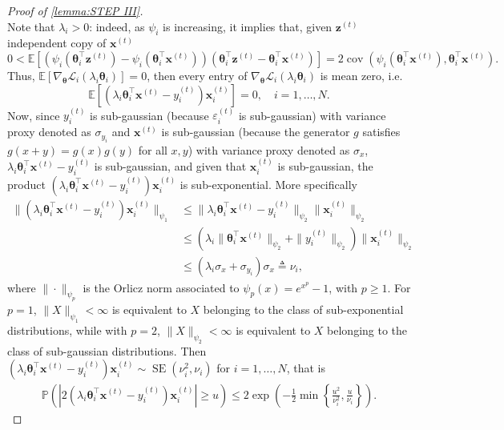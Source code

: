 \documentclass{article} %
\begin{document}
\begin{proof}[Proof of \cref{lemma:STEP III}]
\begin{equation}
\end{equation}
Note that $\lambda_i>0$: indeed, as $\psi_i$ is increasing, it implies that, given $\mathbf{z}^{(t)}$ independent copy of $\mathbf{x}^{(t)}$
\begin{equation}\label{eq:lambda_positive}
0<\mathbb{E}\left[\left(\psi_i\left(\boldsymbol{\theta}_i^\top \mathbf{z}^{(t)}\right)-\psi_i\left(\boldsymbol{\theta}_i^\top \mathbf{x}^{(t)}\right)\right)\left(\boldsymbol{\theta}_i^\top \mathbf{z}^{(t)}-\boldsymbol{\theta}_i^\top \mathbf{x}^{(t)}\right)\right]=2 \operatorname{cov}\left(\psi_i\left(\boldsymbol{\theta}_i^\top \mathbf{x}^{(t)}\right), \boldsymbol{\theta}_i^\top \mathbf{x}^{(t)}\right).
\end{equation}
\noindent
Thus, $\mathbb{E}\left[\nabla_{\boldsymbol{\theta}} \mathscr{L}_i\left(\lambda_i\boldsymbol{\theta}_i\right)\right]= 0$, then every entry of $\nabla_{\boldsymbol{\theta}} \mathscr{L}_i\left(\lambda_i\boldsymbol{\theta}_i\right)$ is mean zero, i.e.
$$
\mathbb{E}\left[(\lambda_i\boldsymbol{\theta}_i^{\top} \mathbf{x}^{(t)}- y_i^{(t)}) \mathbf{x}_{i}^{(t)}\right]=0, \quad i=1,\dots,N.
$$
\noindent
Now, since $y_i^{(t)}$ is sub-gaussian (because $\varepsilon^{(t)}_i$ is sub-gaussian) with variance proxy denoted as $\sigma_{y_i}$ and $\mathbf{x}^{(t)}$ is sub-gaussian (because the generator $g$ satisfies $g(x+y)=g(x)g(y)$ for all $x,y$) with variance proxy denoted as $\sigma_x$, $\lambda_i\boldsymbol{\theta}_i^{\top} \mathbf{x}^{(t)}- y_i^{(t)}$ is sub-gaussian, and given that $\mathbf{x}_{i}^{(t)}$ is sub-gaussian, the product $(\lambda_i\boldsymbol{\theta}_i^{\top} \mathbf{x}^{(t)}- y_i^{(t)})\mathbf{x}_{i}^{(t)}$ is sub-exponential. More specifically
\begin{align}
\|(\lambda_i\boldsymbol{\theta}_i^{\top} \mathbf{x}^{(t)}- y_i^{(t)})\mathbf{x}_{i}^{(t)}\|_{\psi_1} &\leq \|\lambda_i\boldsymbol{\theta}_i^{\top} \mathbf{x}^{(t)}- y_i^{(t)}\|_{\psi_2}\|\mathbf{x}_{i}^{(t)}\|_{\psi_2} \nonumber\\
&\leq (\lambda_i\|\boldsymbol{\theta}_i^{\top} \mathbf{x}^{(t)}\|_{\psi_2}+\|y_i^{(t)}\|_{\psi_2})\|\mathbf{x}_{i}^{(t)}\|_{\psi_2} \nonumber\\
&\leq (\lambda_i  \sigma_x+\sigma_{y_i})\sigma_x \triangleq \nu_i,
\end{align}
where $\|\cdot\|_{\psi_p}$ is the Orlicz norm associated to $\psi_p(x)=e^{x^p}-1$, with $p \geq 1$. For $p=1$, $\|X\|_{\psi_1}<\infty$ is equivalent to $X$ belonging to the class of sub-exponential distributions, while with $p=2$, $\|X\|_{\psi_2}<\infty$ is equivalent to $X$ belonging to the class of sub-gaussian distributions. Then $(\lambda_i\boldsymbol{\theta}_i^{\top} \mathbf{x}^{(t)}- y_i^{(t)})\mathbf{x}_{i}^{(t)} \sim \operatorname{SE}(\nu_i^2, \nu_i)$ for $i=1,\dots,N$, that is 
$$
\begin{aligned}
\mathbb{P}\left(\left|2\left(\lambda_i\boldsymbol{\theta}_i^{\top} \mathbf{x}^{(t)}- y_i^{(t)}\right) \mathbf{x}_{i}^{(t)}\right| \geq u\right) \leq 2 \exp \left(-\frac{1}{2}\min\left\{\frac{u^2}{\nu_i^2},\frac{u}{\nu_i}\right\}\right).
\end{aligned}
$$


\end{proof}
\end{document}
